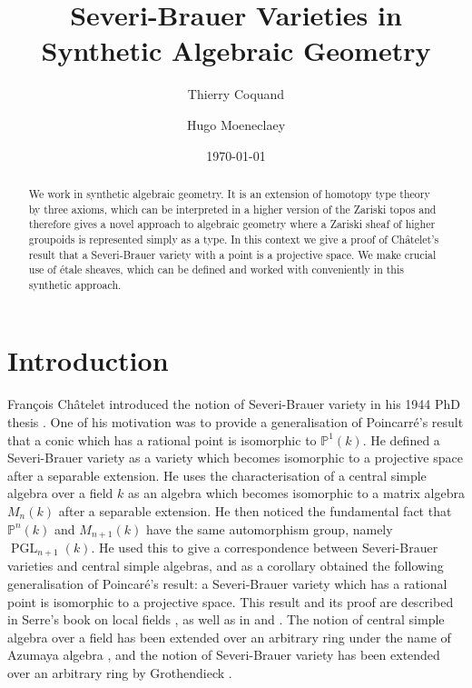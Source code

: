 \documentclass[10pt,a4paper]{article}
\theoremstyle{definition}
\DeclareMathOperator{\PGL}{PGL}
\newcommand{\bP}{\mathbb{P}}
\begin{document}
\title{Severi-Brauer Varieties in Synthetic Algebraic Geometry}

\author{Thierry Coquand}
\author{Hugo Moeneclaey}
\date{\today}
\maketitle


\begin{abstract}
We work in synthetic algebraic geometry. It is an extension of homotopy type theory by three axioms, which can be interpreted in a higher version of the Zariski topos and therefore gives a novel approach to algebraic geometry where a Zariski sheaf of higher groupoids is represented simply as a type. In this context we give a proof of Ch\^atelet's result that a Severi-Brauer variety with a point is a projective space. We make crucial use of étale sheaves, which can be defined and worked with conveniently in this synthetic approach.
\end{abstract}

\tableofcontents


\section*{Introduction}

{F}ran\c cois {C}h\^atelet introduced the notion of Severi-Brauer variety in his 1944 PhD thesis
\cite{chatelet44}. One of his motivation was to provide
a generalisation of Poincarr\'e's result that a conic which has a rational point is isomorphic to $\bP^1(k)$.
He defined a Severi-Brauer variety as a variety which becomes isomorphic to a projective space after
a separable extension. He uses the characterisation of a central simple algebra over a field $k$ as
an algebra which becomes isomorphic to a matrix algebra $M_n(k)$ after a separable extension. He then noticed the fundamental
fact that $\bP^{n}(k)$ and $M_{n+1}(k)$ have the same automorphism group, namely $\PGL_{n+1}(k)$. He used this
to give a correspondence between Severi-Brauer varieties and central simple algebras, and as a corollary
obtained the following generalisation of Poincar\'e's result: a Severi-Brauer variety which has a rational point
is isomorphic to a projective space. This result and its proof are described in Serre's book on local fields \cite{serre62}, as well as in \cite{colliot88} and \cite{gille2017central}. The notion of central simple algebra over a field has been extended over an arbitrary ring under the name of Azumaya algebra \cite{azumaya51}, and the notion of Severi-Brauer variety has been extended over an arbitrary ring by Grothendieck \cite{grothendieck68}.
\end{document}
